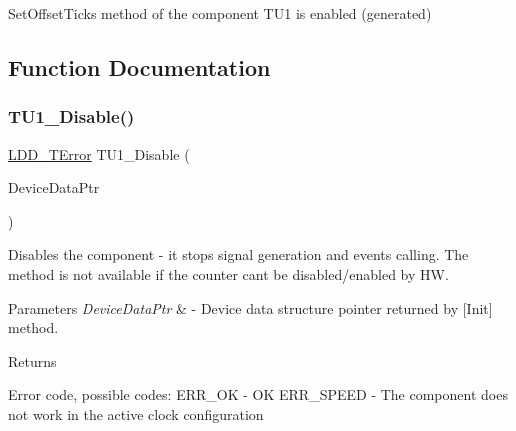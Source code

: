 Set\+Offset\+Ticks method of the component T\+U1 is enabled (generated) 

\subsection{Function Documentation}
\mbox{\label{group___t_u1__module_ga9b93f60b75b41cf6a57cf827467c0690}} 
\subsubsection{\texorpdfstring{T\+U1\+\_\+\+Disable()}{TU1\_Disable()}}
{\footnotesize\ttfamily \hyperlink{group___p_e___types__module_ga24c2b045fd04e79e85f261ce4df35588}{L\+D\+D\+\_\+\+T\+Error} T\+U1\+\_\+\+Disable (\begin{DoxyParamCaption}\item[{\hyperlink{group___p_e___types__module_gac5cf1362f1f0e3a2ce71b1bf2276d091}{L\+D\+D\+\_\+\+T\+Device\+Data} $\ast$}]{Device\+Data\+Ptr }\end{DoxyParamCaption})}



Disables the component -\/ it stops signal generation and events calling. The method is not available if the counter can\textquotesingle{}t be disabled/enabled by HW. 


\begin{DoxyParams}{Parameters}
{\em Device\+Data\+Ptr} & -\/ Device data structure pointer returned by \mbox{[}Init\mbox{]} method. \\
\hline
\end{DoxyParams}
\begin{DoxyReturn}{Returns}

\begin{DoxyItemize}
\item Error code, possible codes\+: E\+R\+R\+\_\+\+OK -\/ OK E\+R\+R\+\_\+\+S\+P\+E\+ED -\/ The component does not work in the active clock configuration 
\end{DoxyItemize}
\end{DoxyReturn}
\mbox{\label{group___t_u1__module_ga8afe0865e773903efe7de4629c06eaa1}} 
